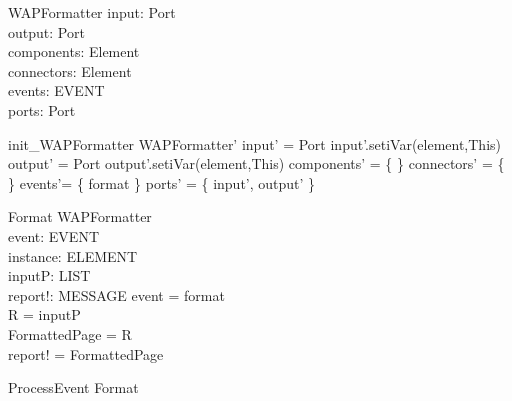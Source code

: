 \begin{schema}{WAPFormatter}
input:  Port \\
output: Port \\
components: \pset Element \\
connectors: \pset Element \\
events: \pset EVENT \\
ports: \pset Port 
\end{schema}


\begin{zed}
init\_WAPFormatter \sdef \lsch WAPFormatter' \bbar input' = \new Port \land input'.setiVar(element,This) \land output' = \new Port \land output'.setiVar(element,This) \land components' = \{ \} \land  connectors' = \{ \} \land events'= \{ format \}  \land ports' = \{ input', output'   \} \rsch  \end{zed}

\begin{schema}{Format}
\Delta WAPFormatter \\
event: EVENT \\
instance: ELEMENT \\
inputP: LIST \\
report!: MESSAGE
\where event = format \\ 
R = \head inputP \\
FormattedPage = R \\
report! = FormattedPage 
\end{schema}


\begin{zed} ProcessEvent \sdef Format
\end{zed}
